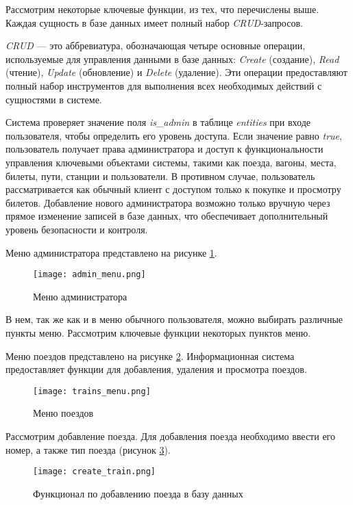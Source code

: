 Рассмотрим некоторые ключевые функции, из тех, что перечислены выше. Каждая сущность в базе данных имеет полный набор \textit{CRUD}-запросов. 

\textit{CRUD} — это аббревиатура, обозначающая четыре основные операции, используемые для управления данными в базе данных: \textit{Create} (создание), \textit{Read} (чтение), \textit{Update} (обновление) и \textit{Delete} (удаление). Эти операции предоставляют полный набор инструментов для выполнения всех необходимых действий с сущностями в системе.

Система проверяет значение поля \textit{is_admin} в таблице \textit{entities} при входе пользователя, чтобы определить его уровень доступа. Если значение равно \textit{true}, пользователь получает права администратора и доступ к функциональности управления ключевыми объектами системы, такими как поезда, вагоны, места, билеты, пути, станции и пользователи. В противном случае, пользователь рассматривается как обычный клиент с доступом только к покупке и просмотру билетов. Добавление нового администратора возможно только вручную через прямое изменение записей в базе данных, что обеспечивает дополнительный уровень безопасности и контроля.

Меню администратора представлено на рисунке \ref{fig:admin_menu}.

\begin{figure}[h]
    \centering
    \texttt{[image: admin\_menu.png]}
    \caption{Меню администратора}
    \label{fig:admin_menu}
\end{figure}

В нем, так же как и в меню обычного пользователя, можно выбирать различные пункты меню. Рассмотрим ключевые функции некоторых пунктов меню.

Меню поездов представлено на рисунке \ref{fig:trains_menu}. Информационная система предоставляет функции для добавления, удаления и просмотра поездов.

\begin{figure}[h]
    \centering
    \texttt{[image: trains\_menu.png]}
    \caption{Меню поездов}
    \label{fig:trains_menu}
\end{figure}

Рассмотрим добавление поезда. Для добавления поезда необходимо ввести его номер, а также тип поезда (рисунок \ref{fig:create_train}).

\begin{figure}[h]
    \centering
    \texttt{[image: create\_train.png]}
    \caption{Функционал по добавлению поезда в базу данных}
    \label{fig:create_train}
\end{figure}


